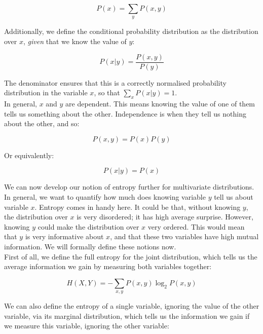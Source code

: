 \documentclass{article}
\begin{document}
\begin{equation*}
    P(x) = \sum_y P(x,y)
\end{equation*}

Additionally, we define the conditional probability distribution as the distribution over $x$, \textit{given} that we know the value of $y$:

\begin{equation*}
    P(x|y) = \frac{P(x,y)}{P(y)}
\end{equation*}

The denominator ensures that this is a correctly normalised probability distribution in the variable $x$, so that $\sum_x P(x|y) = 1$.\\

In general, $x$ and $y$ are dependent. This means knowing the value of one of them tells us something about the other. Independence is when they tell us nothing about the other, and so:

\begin{equation*}
    P(x,y) = P(x)P(y)
\end{equation*}

Or equivalently:

\begin{equation*}
    P(x|y) = P(x)
\end{equation*}

We can now develop our notion of entropy further for multivariate distributions. In general, we want to quantify how much does knowing variable $y$ tell us about variable $x$. Entropy comes in handy here. It could be that, without knowing $y$, the distribution over $x$ is very disordered; it has high average surprise. However, knowing $y$ could make the distribution over $x$ very ordered. This would mean that $y$ is very informative about $x$, and that these two variables have high mutual information. We will formally define these notions now.\\

First of all, we define the full entropy for the joint distribution, which tells us the average information we gain by measuring both variables together:

\begin{equation*}
    H(X,Y) = -\sum_{x,y} P(x,y) \log_2P(x,y)
\end{equation*}

We can also define the entropy of a single variable, ignoring the value of the other variable, via its marginal distribution, which tells us the information we gain if we measure this variable, ignoring the other variable:
\end{document}

